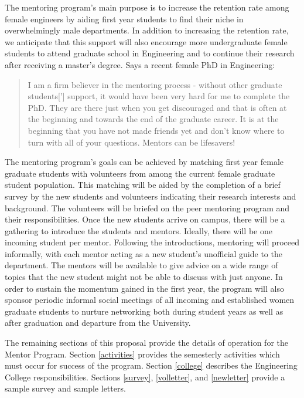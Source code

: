 The mentoring program's main purpose is to increase the retention
rate among female engineers by
aiding first year students
to find their niche in overwhelmingly male departments.
In addition to increasing the retention rate, we anticipate that this
support will also encourage more undergraduate female students to 
attend graduate school in Engineering and to  
continue their research after receiving a master's degree.
Says a recent female PhD in Engineering:
\begin{quote}
 I am a firm believer in the mentoring
process - without other graduate students['] support, it would have been
very hard for me to complete the PhD.  They are there just when you get
discouraged and that is often at the beginning and towards the end of the
graduate career.  It is at the beginning that you have not made friends
yet and don't know where to turn with all of your questions.  Mentors can
be lifesavers!
\end{quote}

The mentoring program's goals can be achieved by 
matching first year female graduate students with 
volunteers from among the current female graduate student population. 
This matching will be aided by the completion of a brief survey by the 
new students and volunteers indicating their research interests
and background.  The volunteers will be briefed
on the peer mentoring program and their responsibilities.
Once the new students arrive on campus, 
there will be a gathering to introduce the 
students and mentors.  Ideally, there will be one 
incoming student per mentor.
Following the introductions, mentoring 
will proceed informally, with each mentor acting as a new student's
unofficial guide to the department.  The mentors will
be available to give advice 
on a wide range of topics that the new student might not be able to 
discuss with just anyone.
In order to sustain the momentum gained in the first year, the
program will also sponsor
periodic informal social meetings of all incoming and established
women graduate students to nurture networking both during student years as
well as after graduation and departure from the University.


The remaining sections of this proposal provide the details of 
operation for the Mentor Program.  
Section \ref{activities} provides the semesterly activities which must
occur for success of the program.
Section \ref{college} describes the Engineering College
responsibilities. 
Sections \ref{survey}, \ref{volletter}, and \ref{newletter} 
provide a sample survey and sample letters.

